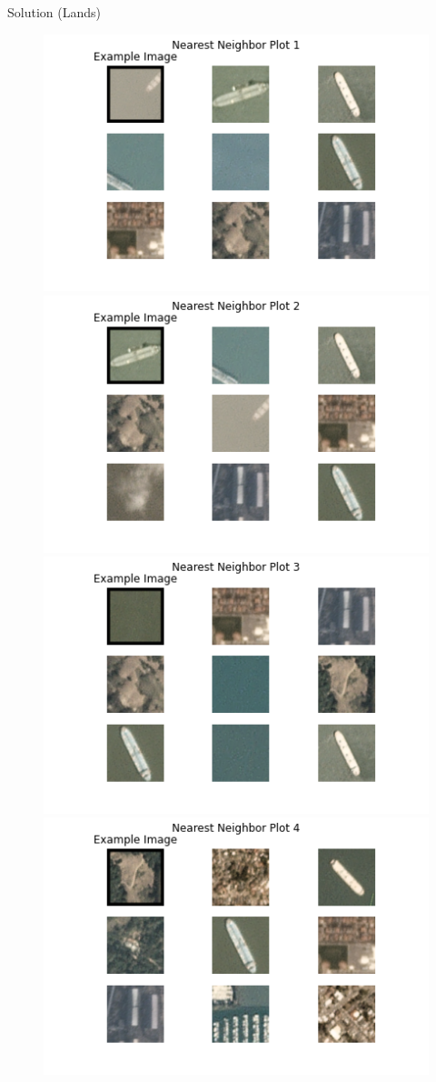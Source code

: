 \documentclass{beamer}
\begin{document}
	\begin{frame}[t]{Solution (Lands)}
		\begin{figure}
			\includegraphics[scale=0.2]{land0.png}
			\includegraphics[scale=0.2]{land1.png}
			\includegraphics[scale=0.2]{land2.png}
			\includegraphics[scale=0.2]{land3.png}

\end{figure}
\end{frame}
\end{document}
